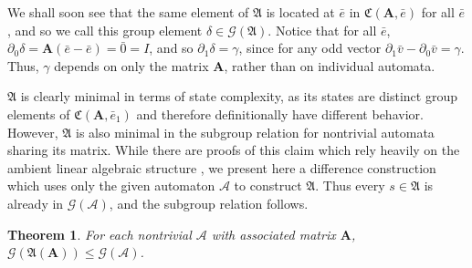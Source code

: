 \documentclass[runningheads]{llncs}
\newcommand{\A}{\mathcal{A}}
\newcommand{\G}{\mathcal{G}}
\renewcommand{\P}{\mathfrak{A}}
\newcommand{\C}{\mathfrak{C}(\Am,\e)}
\newcommand{\2}{\textbf{2}}
\newcommand{\Am}{\textbf{A}}
\newcommand{\del}{\partial}
\newcommand{\vv}{\bar{v}}
\newcommand{\e}{\bar{e}}
\newtheorem{thm}{Theorem}
\begin{document}
We shall soon see that the same element of $\P$ is located at $\e$ in 
$\C$ for all $\e$, and so we call this group element $\delta \in \G(\P)$. 
Notice that for all $\e$, $\del_0 \delta = \Am(\e - \e) = \bar{0} = I$, and so
$\del_1 \delta = \gamma$, since for any odd vector 
$\del_1 \vv - \del_0 \vv = \gamma$. Thus, $\gamma$ depends on only the 
matrix $\Am$, rather than on individual automata.

$\P$ is clearly minimal in terms of state complexity, as its states are
distinct group elements of $\mathfrak{C}(\Am, \e_1)$ and therefore 
definitionally have different behavior. However, $\P$ is also minimal in the
subgroup relation for nontrivial automata sharing its matrix. 
While there are proofs of this claim which rely heavily on the
ambient linear algebraic structure \cite{Okano15:thesis}, 
we present here a difference construction which uses only the given 
automaton $\A$ to construct $\P$. Thus every $s \in \P$ is already in
$\G(\A)$, and the subgroup relation follows.

\begin{thm}
  For each nontrivial $\A$ with associated matrix $\Am$,\\
  $\G(\P(\Am)) \leq \G(\A)$.
\end{thm}
\end{document}
